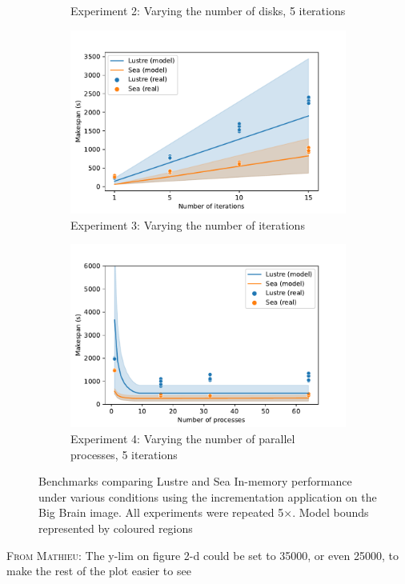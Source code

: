 \documentclass[10pt,journal,compsoc]{IEEEtran}
\newcommand{\MD}[1]{\color{magenta}\textsc{From Mathieu}: #1\xspace\color{black}}
\begin{document}
\begin{figure}
\begin{subfigure}{\columnwidth}
        \caption{Experiment 2: Varying the number of disks, 5
        iterations}\label{fig:sea-comp:disks}
    \end{subfigure}
    \begin{subfigure}{\columnwidth}
        \centering
        \captionsetup{width=.85\linewidth}
        \includegraphics[width=\linewidth]{figures/iterations.pdf}
        \caption{Experiment 3: Varying the number of
        iterations}\label{fig:sea-comp:iterations}
    \end{subfigure}
    \begin{subfigure}{\columnwidth}
        \centering
        \captionsetup{width=.85\linewidth}
        \includegraphics[width=\linewidth]{figures/threads.pdf}
        \caption{Experiment 4: Varying the number of parallel processes, 5
        iterations}\label{fig:sea-comp:processes}
    \end{subfigure}
    \caption{Benchmarks comparing Lustre and Sea In-memory performance under
    various conditions using the incrementation application on the Big Brain
    image. All experiments were repeated 5$\times$. Model bounds represented by
    coloured regions}
    \label{fig:sea-comp:benchmarks}
    \end{figure}
    \MD{The y-lim on figure 2-d could be set to 35000, or even 25000, to make the rest of the plot easier to see}
\end{document}
